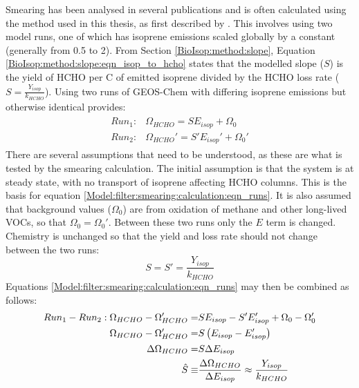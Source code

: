 \documentclass[acp, manuscript]{copernicus}
\newcommand{\parencite}{\citep}
\newcommand{\textcite}{\citet}
\begin{document}
    Smearing has been analysed in several publications \parencite[e.g.,][]{Martin2003nox, Palmer2003, Millet2006, Stavrakou2009, Marais2012, Barkley2013, Zhu2014, Wolfe2016, Surl2018} and is often calculated using the method used in this thesis, as first described by \textcite{Palmer2003}.
    This involves using two model runs, one of which has isoprene emissions scaled globally by a constant (generally from 0.5 to 2).
    From Section \ref{BioIsop:method:slope}, Equation \ref{BioIsop:method:slope:eqn_isop_to_hcho} states that the modelled slope ($S$) is the yield of HCHO per C of emitted isoprene divided by the HCHO loss rate ($S = \frac{Y_{isop}}{k_{HCHO}}$).
    Using two runs of GEOS-Chem with differing isoprene emissions but otherwise identical provides:
    \begin{eqnarray}
    \label{Model:filter:smearing:calculation:eqn_runs}
    \begin{split}
    Run_1 :&  \Omega_{HCHO} = S E_{isop} + \Omega_0 \\
    Run_2 :&  \Omega_{HCHO}' = S' E_{isop}' + \Omega_0' 
    \end{split}
    \end{eqnarray}
    There are several assumptions that need to be understood, as these are what is tested by the smearing calculation.
    The initial assumption is that the system is at steady state, with no transport of isoprene affecting HCHO columns.
    This is the basis for equation \ref{Model:filter:smearing:calculation:eqn_runs}.
    It is also assumed that background values ($\Omega_0$) are from oxidation of methane and other long-lived VOCs, so that $\Omega_0 = \Omega_0'$.
    Between these two runs only the $E$ term is changed.
    Chemistry is unchanged so that the yield and loss rate should not change between the two runs: 
    \begin{equation}
    S = S' = \frac{Y_{isop}}{k_{HCHO}}
    \end{equation}
    Equations \ref{Model:filter:smearing:calculation:eqn_runs} may then be combined as follows:
    \begin{eqnarray}
    Run_1-Run_2 : \Omega_{HCHO} - \Omega_{HCHO}' = & S E_{isop} - S' E_{isop}' +\Omega_0 - \Omega_0' \notag \\
    \Omega_{HCHO} - \Omega_{HCHO}' = & S \left( E_{isop} - E_{isop}' \right) \notag \\
    \Delta \Omega_{HCHO} = & S \Delta E_{isop}  \notag \\
    \hat{S} \equiv & \frac{\Delta{\Omega_{HCHO}}}{\Delta E_{isop}} \approx \frac{Y_{isop}}{k_{HCHO}} \label{Model:filter:smearing:calculation:eqn_hats}
    \end{eqnarray}
\end{document}
